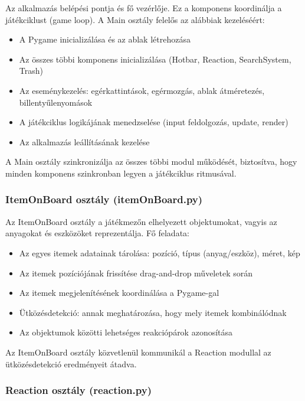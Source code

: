 \documentclass[]{thesis-ekf}
\begin{document}
	Az alkalmazás belépési pontja és fő vezérlője. Ez a komponens koordinálja a játékciklust (game loop). A Main osztály felelős az alábbiak kezeléséért:
	\begin{itemize}
		\item A Pygame inicializálása és az ablak létrehozása
		\item Az összes többi komponens inicializálása (Hotbar, Reaction, SearchSystem, Trash)
		\item Az eseménykezelés: egérkattintások, egérmozgás, ablak átméretezés, billentyűlenyomások
		\item A játékciklus logikájának menedzselése (input feldolgozás, update, render)
		\item Az alkalmazás leállításának kezelése
	\end{itemize}
	
	A Main osztály szinkronizálja az összes többi modul működését, biztosítva, hogy minden komponens szinkronban legyen a játékciklus ritmusával.
	
	\subsubsection{ItemOnBoard osztály (itemOnBoard.py)}
	
	Az ItemOnBoard osztály a játékmezőn elhelyezett objektumokat, vagyis az anyagokat és eszközöket reprezentálja.
	Fő feladata:
	\begin{itemize}
		\item Az egyes itemek adatainak tárolása: pozíció, típus (anyag/eszköz), méret, kép
		\item Az itemek pozíciójának frissítése drag-and-drop műveletek során
		\item Az itemek megjelenítésének koordinálása a Pygame-gal
		\item Ütközésdetekció: annak meghatározása, hogy mely itemek kombinálódnak\cite{Kombination}
		\item Az objektumok közötti lehetséges reakciópárok azonosítása
	\end{itemize}
	Az ItemOnBoard osztály közvetlenül kommunikál a Reaction modullal az ütközésdetekció eredményeit átadva.
	
	\subsubsection{Reaction osztály (reaction.py)}
	
\end{document}
